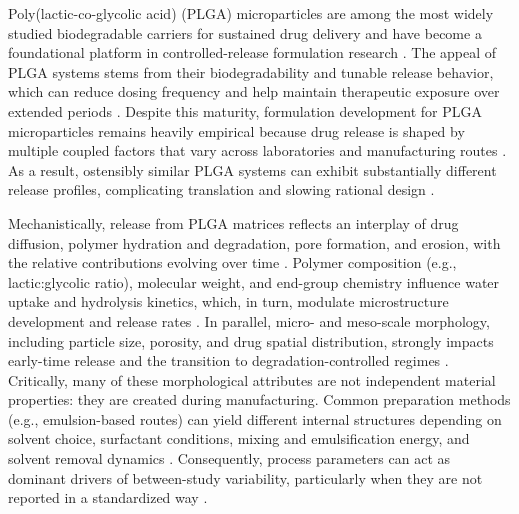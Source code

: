 \documentclass[preprint,12pt,authoryear]{elsarticle}
\begin{document}
Poly(lactic-co-glycolic acid) (PLGA) microparticles are among the most widely studied biodegradable carriers for sustained drug delivery and have become a foundational platform in controlled-release formulation research \citep{MakadiaSiegel2011, FreibergZhu2004}. The appeal of PLGA systems stems from their biodegradability and tunable release behavior, which can reduce dosing frequency and help maintain therapeutic exposure over extended periods \citep{MakadiaSiegel2011, Fredenberg2011}. Despite this maturity, formulation development for PLGA microparticles remains heavily empirical because drug release is shaped by multiple coupled factors that vary across laboratories and manufacturing routes \citep{Fredenberg2011, Jain2000}. As a result, ostensibly similar PLGA systems can exhibit substantially different release profiles, complicating translation and slowing rational design \citep{Fredenberg2011}.

Mechanistically, release from PLGA matrices reflects an interplay of drug diffusion, polymer hydration and degradation, pore formation, and erosion, with the relative contributions evolving over time \citep{Fredenberg2011}. Polymer composition (e.g., lactic:glycolic ratio), molecular weight, and end-group chemistry influence water uptake and hydrolysis kinetics, which, in turn, modulate microstructure development and release rates \citep{MakadiaSiegel2011, Fredenberg2011}. In parallel, micro- and meso-scale morphology, including particle size, porosity, and drug spatial distribution, strongly impacts early-time release and the transition to degradation-controlled regimes \citep{Fredenberg2011}. Critically, many of these morphological attributes are not independent material properties: they are created during manufacturing. Common preparation methods (e.g., emulsion-based routes) can yield different internal structures depending on solvent choice, surfactant conditions, mixing and emulsification energy, and solvent removal dynamics \citep{Jain2000}. Consequently, process parameters can act as dominant drivers of between-study variability, particularly when they are not reported in a standardized way \citep{Jain2000, Fredenberg2011}.
\end{document}
